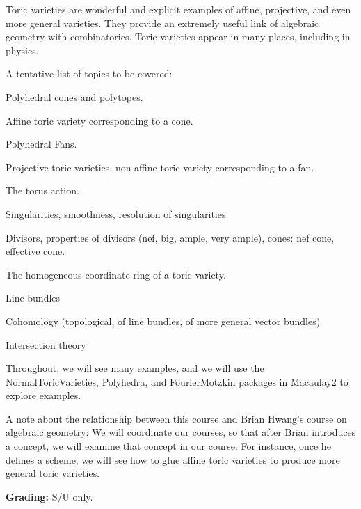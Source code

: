 \documentclass[11pt]{article}
\begin{document}
Toric varieties are wonderful and explicit examples of affine,
projective, and even more general varieties.  They provide an
extremely useful link of algebraic geometry with combinatorics.  Toric
varieties appear in many places, including in physics.

A tentative list of topics to be covered:

\begin{compactitem}
\item Polyhedral cones and polytopes.
\item Affine toric variety corresponding to a cone.
\item Polyhedral Fans.
\item Projective toric varieties, non-affine toric variety corresponding to a fan.
\item The torus action.
\item Singularities, smoothness, resolution of singularities
\item Divisors, properties of divisors (nef, big, ample, very ample),
    cones: nef cone, effective cone.
\item The homogeneous coordinate ring of a toric variety.
\item Line bundles
\item Cohomology (topological, of line bundles, of more general vector bundles)
\item Intersection theory
\end{compactitem}
Throughout, we will see many examples, and we will use the
NormalToricVarieties, Polyhedra, and FourierMotzkin packages in
Macaulay2 to explore examples.

A note about the relationship between this course and Brian Hwang's
course on algebraic geometry: We will coordinate our courses, so that
after Brian introduces a concept, we will examine that concept in our
course.  For instance, once he defines a scheme, we will see how to
glue affine toric varieties to produce more general toric varieties.

\medskip
\noindent
{\bf Grading:}
\noindent
S/U only. 
\end{document}

